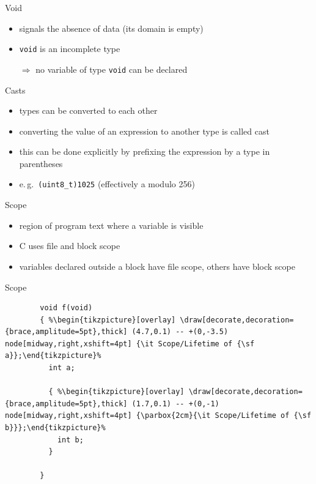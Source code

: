 \documentclass[english,compress]{beamer}
\begin{document}
\begin{frame}{Void}
	\begin{itemize}
		\item signals the absence of data (its domain is empty)
		\item \lstinline|void| is an incomplete type
		\item[$\Rightarrow$] no variable of type \lstinline|void|
			can be declared
	\end{itemize}
\end{frame}

\begin{frame}{Casts}
	\begin{itemize}
		\item types can be converted to each other
		\item converting the value of an expression to another type is called cast
		\item this can be done explicitly by prefixing the expression by a type in parentheses 
		\item e.\,g.\ \lstinline|(uint8_t)1025| (effectively a modulo 256)
	\end{itemize}
\end{frame}

\begin{frame}{Scope}
	\begin{itemize}
		\item region of program text where a variable is visible
		\item C uses file and block scope
		\item variables declared outside a block have file scope,
			others have block scope
	\end{itemize}
\end{frame}

\begin{frame}[fragile]{Scope}
	\begin{lstlisting}
		void f(void)
		{ %\begin{tikzpicture}[overlay] \draw[decorate,decoration={brace,amplitude=5pt},thick] (4.7,0.1) -- +(0,-3.5) node[midway,right,xshift=4pt] {\it Scope/Lifetime of {\sf a}};\end{tikzpicture}%
		  int a;

		  { %\begin{tikzpicture}[overlay] \draw[decorate,decoration={brace,amplitude=5pt},thick] (1.7,0.1) -- +(0,-1) node[midway,right,xshift=4pt] {\parbox{2cm}{\it Scope/Lifetime of {\sf b}}};\end{tikzpicture}%
		    int b;
		  }

		}
	\end{lstlisting}
\end{frame}
\end{document}
